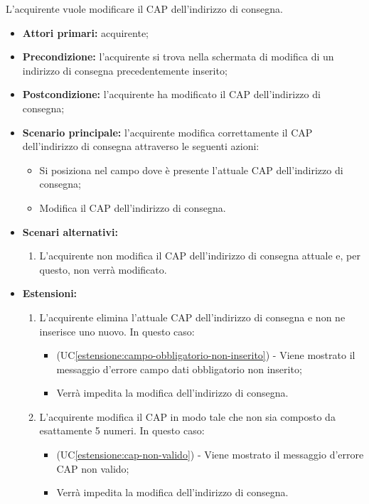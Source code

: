 L'acquirente vuole modificare il CAP dell'indirizzo di consegna.
\begin{itemize}
    \item \textbf{Attori primari:} acquirente;
    \item \textbf{Precondizione:} l'acquirente si trova nella schermata di modifica di un indirizzo di consegna precedentemente inserito;
    \item \textbf{Postcondizione:} l'acquirente ha modificato il CAP dell'indirizzo di consegna;
    \item \textbf{Scenario principale:} l'acquirente modifica correttamente il CAP dell'indirizzo di consegna attraverso le seguenti azioni:
    \begin{itemize}
        \item Si posiziona nel campo dove è presente l'attuale CAP dell'indirizzo di consegna;
        \item Modifica il CAP dell'indirizzo di consegna.
    \end{itemize}
    \item \textbf{Scenari alternativi:}
    \begin{enumerate}[label=\lett]
        \item L'acquirente non modifica il CAP dell'indirizzo di consegna attuale e, per questo, non verrà modificato.
    \end{enumerate}
    \item \textbf{Estensioni:}
    \begin{enumerate}[label=\lett]
        \item L'acquirente elimina l'attuale CAP dell'indirizzo di consegna e non ne inserisce uno nuovo. In questo caso:
        \begin{itemize}
            \item (UC\ref{estensione:campo-obbligatorio-non-inserito}) - Viene mostrato il messaggio d'errore campo dati obbligatorio non inserito;
            \item Verrà impedita la modifica dell'indirizzo di consegna.
        \end{itemize}
        \item L'acquirente modifica il CAP in modo tale che non sia composto da esattamente 5 numeri. In questo caso:
        \begin{itemize}
            \item (UC\ref{estensione:cap-non-valido}) - Viene mostrato il messaggio d'errore CAP non valido;
            \item Verrà impedita la modifica dell'indirizzo di consegna.
        \end{itemize}
    \end{enumerate}
\end{itemize}

